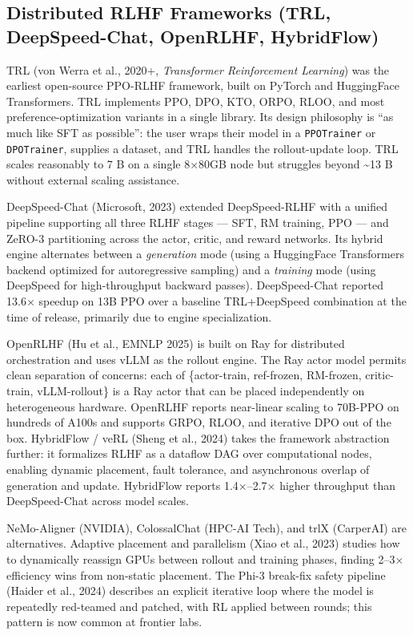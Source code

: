 \subsection{Distributed RLHF Frameworks (TRL, DeepSpeed-Chat, OpenRLHF, HybridFlow)}\label{distributed-rlhf-frameworks-trl-deepspeed-chat-openrlhf-hybridflow}

TRL (von Werra et al., 2020+, \emph{Transformer Reinforcement Learning}) was the earliest open-source PPO-RLHF framework, built on PyTorch and HuggingFace Transformers. TRL implements PPO, DPO, KTO, ORPO, RLOO, and most preference-optimization variants in a single library. Its design philosophy is ``as much like SFT as possible'': the user wraps their model in a \texttt{PPOTrainer} or \texttt{DPOTrainer}, supplies a dataset, and TRL handles the rollout-update loop. TRL scales reasonably to 7 B on a single 8×80GB node but struggles beyond \textasciitilde13 B without external scaling assistance.

DeepSpeed-Chat (Microsoft, 2023) extended DeepSpeed-RLHF with a unified pipeline supporting all three RLHF stages --- SFT, RM training, PPO --- and ZeRO-3 partitioning across the actor, critic, and reward networks. Its hybrid engine alternates between a \emph{generation} mode (using a HuggingFace Transformers backend optimized for autoregressive sampling) and a \emph{training} mode (using DeepSpeed for high-throughput backward passes). DeepSpeed-Chat reported 13.6× speedup on 13B PPO over a baseline TRL+DeepSpeed combination at the time of release, primarily due to engine specialization.

OpenRLHF (Hu et al., EMNLP 2025) is built on Ray for distributed orchestration and uses vLLM as the rollout engine. The Ray actor model permits clean separation of concerns: each of \{actor-train, ref-frozen, RM-frozen, critic-train, vLLM-rollout\} is a Ray actor that can be placed independently on heterogeneous hardware. OpenRLHF reports near-linear scaling to 70B-PPO on hundreds of A100s and supports GRPO, RLOO, and iterative DPO out of the box. HybridFlow / veRL (Sheng et al., 2024) takes the framework abstraction further: it formalizes RLHF as a dataflow DAG over computational nodes, enabling dynamic placement, fault tolerance, and asynchronous overlap of generation and update. HybridFlow reports 1.4×--2.7× higher throughput than DeepSpeed-Chat across model scales.

NeMo-Aligner (NVIDIA), ColossalChat (HPC-AI Tech), and trlX (CarperAI) are alternatives. Adaptive placement and parallelism (Xiao et al., 2023) studies how to dynamically reassign GPUs between rollout and training phases, finding 2--3× efficiency wins from non-static placement. The Phi-3 break-fix safety pipeline (Haider et al., 2024) describes an explicit iterative loop where the model is repeatedly red-teamed and patched, with RL applied between rounds; this pattern is now common at frontier labs.

